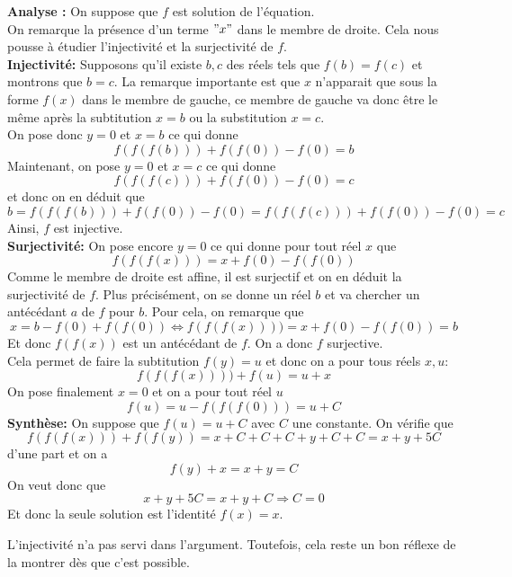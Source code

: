 \begin{sol}
\textbf{Analyse :} On suppose que $f$ est solution de l'équation.
\\
On remarque la présence d'un terme $"x"$ dans le membre de droite. Cela nous pousse à étudier l'injectivité et la surjectivité de $f$.
\\
\textbf{Injectivité:} Supposons qu'il existe $b,c$ des réels tels que $f(b)=f(c)$ et montrons que $b=c$. La remarque importante est que $x$ n'apparait que sous la forme $f(x)$ dans le membre de gauche, ce membre de gauche va donc être le même après la subtitution $x=b$ ou la substitution $x=c$.
\\
On pose donc $y=0$ et $x=b$ ce qui donne
$$f(f(f(b)))+f(f(0))-f(0)=b $$
Maintenant, on pose $y=0$ et $x=c$ ce qui donne
$$f(f(f(c)))+f(f(0))-f(0)=c $$ et donc on en déduit que
$$b=f(f(f(b)))+f(f(0))-f(0)=f(f(f(c)))+f(f(0))-f(0)=c $$
Ainsi, $f$ est injective.
\\
\textbf{Surjectivité:} On pose encore $y=0$ ce qui donne pour tout réel $x$ que
$$f(f(f(x)))=x+f(0)-f(f(0)) $$
Comme le membre de droite est affine, il est surjectif et on en déduit la surjectivité de $f$. Plus précisément, on se donne un réel $b$ et va chercher un antécédant $a$ de $f$ pour $b$. Pour cela, on remarque que
$$x=b-f(0)+f(f(0))\iff f(f(f(x))))=x+f(0)-f(f(0))=b $$
Et donc $f(f(x))$ est un antécédant de $f$. On a donc $f$ surjective.
\\
Cela permet de faire la subtitution $f(y)=u$ et donc on a pour tous réels $x,u$:
$$f(f(f(x))))+f(u)=u+x $$
On pose finalement $x=0$ et on a pour tout réel $u$
$$f(u)=u-f(f(f(0)))=u+C $$
\textbf{Synthèse:} On suppose que $f(u)=u+C$ avec $C$ une constante. On vérifie que
$$f(f(f(x)))+f(f(y))=x+C+C+C+y+C+C=x+y+5C $$
d'une part et on a
$$f(y)+x=x+y=C $$
On veut donc que
$$x+y+5C=x+y+C\Rightarrow C=0 $$
Et donc la seule solution est l'identité $f(x)=x$.
\end{sol}
\begin{rem}
L'injectivité n'a pas servi dans l'argument. Toutefois, cela reste un bon réflexe de la montrer dès que c'est possible.
\end{rem}


